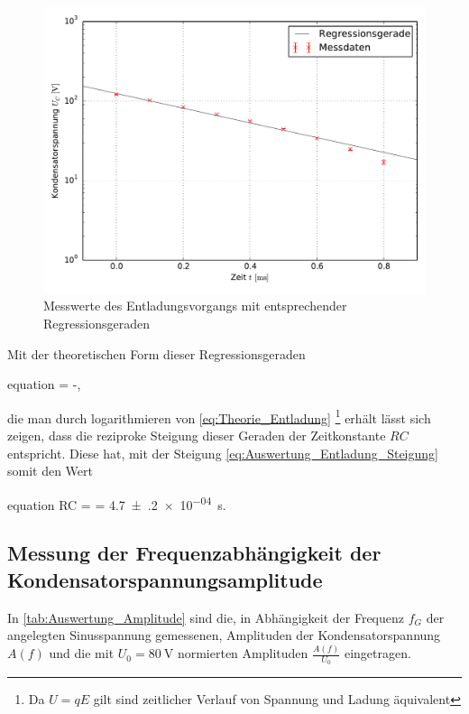 	\begin{figure}[!h]
		\centering
		\includegraphics[scale=0.75]{Grafiken/Entladung.pdf}
		\caption{Messwerte des Entladungsvorgangs mit entsprechender Regressionsgeraden}
		\label{fig:Auswertung_EntladungLog}
	\end{figure}
	 
	Mit der theoretischen Form dieser Regressionsgeraden 
	\begin{empheq}{equation}
		\ln{}  = -, 
	\end{empheq}
	die man durch logarithmieren von \cref{eq:Theorie_Entladung}
	\footnote{Da $ U = qE $ gilt sind zeitlicher Verlauf von Spannung und Ladung äquivalent} erhält
	lässt sich zeigen, dass die reziproke Steigung dieser Geraden der Zeitkonstante $ RC $  entspricht.
	Diese hat, mit der Steigung \cref{eq:Auswertung_Entladung_Steigung} somit den Wert
	\begin{empheq}{equation}
		 RC =   = \SI{4.7(2)e-04}{\second}.
		 \footnotemark
		 \label{eq:Auswertung_RC1}
	\end{empheq}
	 
	 
\subsection{Messung der Frequenzabhängigkeit der \\ Kondensatorspannungsamplitude}
\label{sec:Auswertung_Amplitude}
	In \cref{tab:Auswertung_Amplitude} sind die, in Abhängigkeit der Frequenz $ f_{G} $ der angelegten 
	Sinusspannung gemessenen, Amplituden der Kondensatorspannung $A(f)$ und die mit $ U_{0} = \SI{80}{\volt} $
	normierten Amplituden $ \tfrac{A(f)}{U_{0}} $ eingetragen. 
	
